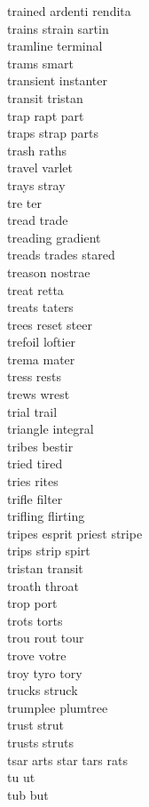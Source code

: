 trained ardenti rendita\\
trains strain sartin\\
tramline terminal\\
trams smart\\
transient instanter\\
transit tristan\\
trap rapt part\\
traps strap parts\\
trash raths\\
travel varlet\\
trays stray\\
tre ter\\
tread trade\\
treading gradient\\
treads trades stared\\
treason nostrae\\
treat retta\\
treats taters\\
trees reset steer\\
trefoil loftier\\
trema mater\\
tress rests\\
trews wrest\\
trial trail\\
triangle integral\\
tribes bestir\\
tried tired\\
tries rites\\
trifle filter\\
trifling flirting\\
tripes esprit priest stripe\\
trips strip spirt\\
tristan transit\\
troath throat\\
trop port\\
trots torts\\
trou rout tour\\
trove votre\\
troy tyro tory\\
trucks struck\\
trumplee plumtree\\
trust strut\\
trusts struts\\
tsar arts star tars rats\\
tu ut\\
tub but\\
